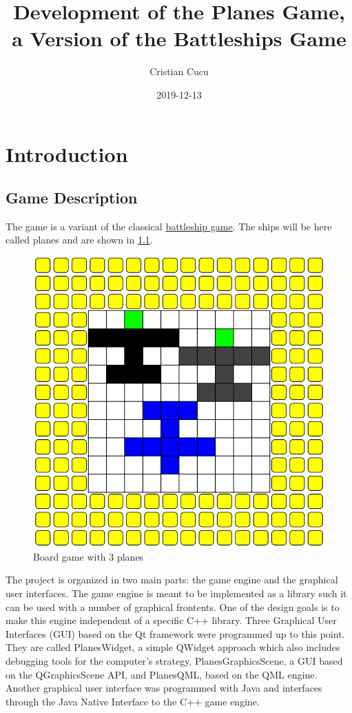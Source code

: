 \documentclass{report}
\title{Development of the Planes Game, a Version of the Battleships Game}
\date{2019-12-13}
\author{Cristian Cucu}
\begin{document}
\maketitle
\newpage
\lstset{language=C++}
\tableofcontents

\chapter{Introduction}

\section{Game Description}
The game is a variant of the classical \href{https://en.wikipedia.org/wiki/Battleship_(game)}{battleship game}. The ships will be here called planes and are shown in \ref{fig:board}.
\begin{figure}[h]
  \includegraphics[width = \textwidth]{BoardWithPlanes.png}
  \caption{Board game with 3 planes}
  \label{fig:board}
\end{figure}
The project is organized in two main parts: the game engine and the graphical user interfaces. The game engine is meant to be implemented as a library such it can be used with a number of graphical frontents. One of the design goals is to make this engine independent of a specific C++ library. Three Graphical User Interfaces (GUI) based on the Qt framework were programmed up to this point. They are called PlanesWidget, a simple QWidget approach which also includes debugging tools for the computer's strategy, PlanesGraphicsScene, a GUI based on the QGraphicsScene API, and PlanesQML, based on the QML engine. Another graphical user interface was programmed with Java and interfaces through the Java Native Interface to the C++ game engine.
\end{document}
